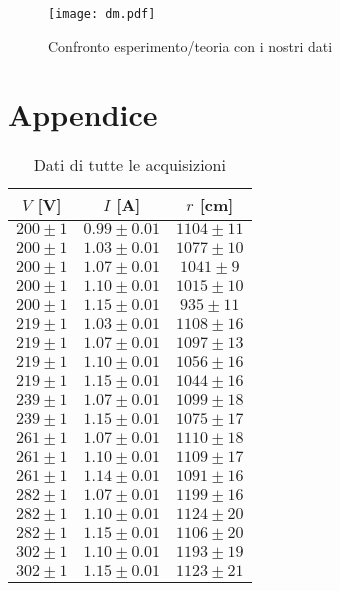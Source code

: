 \begin{figure}[H]
	\centering
	\texttt{[image: dm.pdf]}
	\caption{Confronto esperimento/teoria con i nostri dati}
	\label{dati_nostri}
\end{figure}


\newpage
\section{Appendice}

\begin{table}[hb]
\centering
\begin{tabular}{ccc}
	\toprule
$V$ [\si{\volt}] & 	$I$ [\si{\ampere}] & $r$ [\si{\cm}]\\
\midrule
$200	\pm 1 $	 	&	$0.99 \pm 0.01 $	&	$1104 \pm 	11$	\\
$200	\pm 1 $		&	$1.03 \pm 0.01 $	&	$1077 \pm 	10$	\\
$200	\pm 1 $		&	$1.07 \pm 0.01 $	&	$1041 \pm 	9$	\\
$200	\pm 1 $		&	$1.10 \pm 0.01 $	&	$1015 \pm 	10$	\\
$200	\pm 1 $		&	$1.15 \pm 0.01 $	&	$935 \pm  	11$	\\
$219	\pm 1 $		&	$1.03 \pm 0.01 $	&	$1108 \pm 	16$	\\
$219	\pm 1 $		&	$1.07 \pm 0.01 $	&	$1097 \pm 	13$	\\
$219	\pm 1 $		&	$1.10 \pm 0.01 $	&	$1056 \pm 	16$	\\
$219	\pm 1 $		&	$1.15 \pm 0.01 $	&	$1044 \pm 	16$	\\
$239	\pm 1 $		&	$1.07 \pm 0.01 $	&	$1099 \pm 	18$	\\
$239	\pm 1 $		&	$1.15 \pm 0.01 $	&	$1075 \pm 	17$	\\
$261	\pm 1 $		&	$1.07 \pm 0.01 $	&	$1110 \pm 	18$	\\
$261	\pm 1 $		&	$1.10 \pm 0.01 $	&	$1109 \pm 	17$	\\
$261	\pm 1 $		&	$1.14 \pm 0.01 $	&	$1091 \pm 	16$	\\
$282	\pm 1 $		&	$1.07 \pm 0.01 $	&	$1199 \pm 	16$	\\
$282	\pm 1 $		&	$1.10 \pm 0.01 $	&	$1124 \pm 	20$	\\
$282	\pm 1 $		&	$1.15 \pm 0.01 $	&	$1106 \pm 	20$	\\
$302	\pm 1 $		&	$1.10 \pm 0.01 $	&	$1193 \pm 	19$	\\
$302	\pm 1 $		&	$1.15 \pm 0.01 $	&	$1123 \pm 	21$	\\
\bottomrule
\end{tabular}
\caption{Dati di tutte le acquisizioni}
\label{dati_raggi}
\end{table}

	
	
	
	
	
	
	
	
	
	
	
	
	
	
	
	
	
	
	
	
	
	